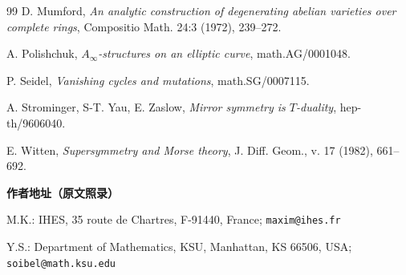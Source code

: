 \begin{thebibliography}{99}
 D. Mumford, \textit{An analytic construction of degenerating abelian varieties over complete rings}, Compositio Math. 24:3 (1972), 239--272.

 A. Polishchuk, \textit{$A_\infty$-structures on an elliptic curve}, math.AG/0001048.

 P. Seidel, \textit{Vanishing cycles and mutations}, math.SG/0007115.

 A. Strominger, S-T. Yau, E. Zaslow, \textit{Mirror symmetry is $T$-duality}, hep-th/9606040.

 E. Witten, \textit{Supersymmetry and Morse theory}, J. Diff. Geom., v. 17 (1982), 661--692.

\end{thebibliography}

\medskip
\noindent\textbf{作者地址（原文照录）}

\noindent M.K.: IHES, 35 route de Chartres, F-91440, France; \texttt{maxim@ihes.fr}

\noindent Y.S.: Department of Mathematics, KSU, Manhattan, KS 66506, USA; \texttt{soibel@math.ksu.edu}
